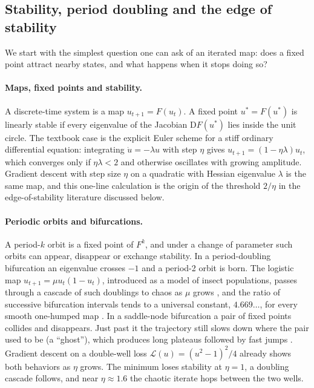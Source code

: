 \subsection{Stability, period doubling and the edge of stability}
\label{sec:eos}

We start with the simplest question one can ask of an iterated map: does a fixed point attract nearby states, and what happens when it stops doing so?

\paragraph{Maps, fixed points and stability.} A discrete-time system is a map $u_{t+1}=F(u_t)$. A fixed point $u^\ast=F(u^\ast)$ is linearly stable if every eigenvalue of the Jacobian $\mathrm{D}F(u^\ast)$ lies inside the unit circle. The textbook case is the explicit Euler scheme for a stiff ordinary differential equation: integrating $\dot u=-\lambda u$ with step $\eta$ gives $u_{t+1}=(1-\eta\lambda)u_t$, which converges only if $\eta\lambda<2$ and otherwise oscillates with growing amplitude. Gradient descent with step size $\eta$ on a quadratic with Hessian eigenvalue $\lambda$ is the same map, and this one-line calculation is the origin of the threshold $2/\eta$ in the edge-of-stability literature discussed below.

\paragraph{Periodic orbits and bifurcations.} A period-$k$ orbit is a fixed point of $F^{k}$, and under a change of parameter such orbits can appear, disappear or exchange stability. In a period-doubling bifurcation an eigenvalue crosses $-1$ and a period-2 orbit is born. The logistic map $u_{t+1}=\mu u_t(1-u_t)$, introduced as a model of insect populations, passes through a cascade of such doublings to chaos as $\mu$ grows \citep{may1976simple}, and the ratio of successive bifurcation intervals tends to a universal constant, $4.669\ldots$, for every smooth one-humped map \citep{feigenbaum1978quantitative}. In a saddle-node bifurcation a pair of fixed points collides and disappears. Just past it the trajectory still slows down where the pair used to be (a ``ghost''), which produces long plateaus followed by fast jumps \citep{strogatz2018nonlinear,dinc2025ghost}. Gradient descent on a double-well loss $\mathcal{L}(u)=(u^2-1)^2/4$ already shows both behaviors as $\eta$ grows. The minimum loses stability at $\eta=1$, a doubling cascade follows, and near $\eta\approx1.6$ the chaotic iterate hops between the two wells.

